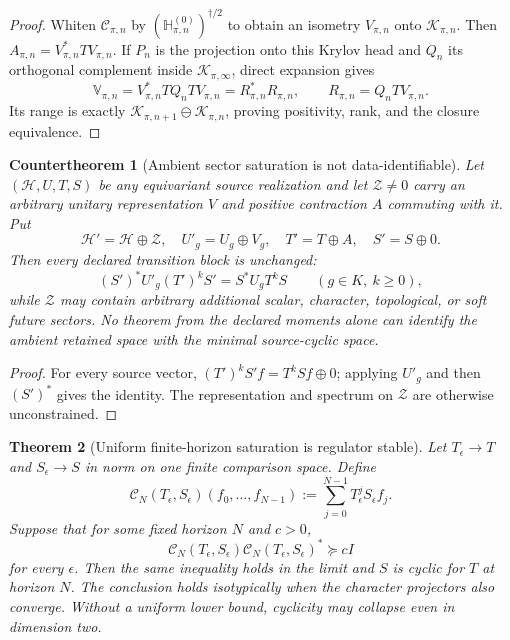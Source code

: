 \documentclass[11pt]{article}
\newtheorem{theorem}{Theorem}[section]
\newtheorem{countertheorem}[theorem]{Countertheorem}
\theoremstyle{definition}
\theoremstyle{remark}
\newcommand{\Hh}{\mathcal H}
\begin{document}
\begin{proof}
Whiten $\mathcal C_{\pi,n}$ by
$(\mathbb H_{\pi,n}^{(0)})^{\dagger/2}$ to obtain an isometry $V_{\pi,n}$ onto
$\mathcal K_{\pi,n}$.  Then $A_{\pi,n}=V_{\pi,n}^*TV_{\pi,n}$.  If $P_n$ is
the projection onto this Krylov head and $Q_n$ its orthogonal complement inside
$\mathcal K_{\pi,\infty}$, direct expansion gives
\[
 \mathbb V_{\pi,n}
 =V_{\pi,n}^*TQ_nTV_{\pi,n}=R_{\pi,n}^*R_{\pi,n},
 \qquad R_{\pi,n}=Q_nTV_{\pi,n}.
\]
Its range is exactly
$\mathcal K_{\pi,n+1}\ominus\mathcal K_{\pi,n}$, proving positivity, rank, and
the closure equivalence.
\end{proof}

\begin{countertheorem}[Ambient sector saturation is not data-identifiable]
\label{cth:ambient-source-master}
Let $(\Hh,U,T,S)$ be any equivariant source realization and let
$\mathcal Z\ne0$ carry an arbitrary unitary representation $V$ and positive
contraction $A$ commuting with it.  Put
\[
 \Hh'=\Hh\oplus\mathcal Z,
 \quad U'_g=U_g\oplus V_g,
 \quad T'=T\oplus A,
 \quad S'=S\oplus0.
\]
Then every declared transition block is unchanged:
\[
 (S')^*U'_g(T')^kS'=S^*U_gT^kS
 \qquad(g\in K,\ k\ge0),
\]
while $\mathcal Z$ may contain arbitrary additional scalar, character,
topological, or soft future sectors.  No theorem from the declared moments
alone can identify the ambient retained space with the minimal source-cyclic
space.
\end{countertheorem}

\begin{proof}
For every source vector, $(T')^kS'f=T^kSf\oplus0$; applying $U'_g$ and then
$(S')^*$ gives the identity.  The representation and spectrum on
$\mathcal Z$ are otherwise unconstrained.
\end{proof}

\begin{theorem}[Uniform finite-horizon saturation is regulator stable]
\label{thm:source-regulator-master}
Let $T_\epsilon\to T$ and $S_\epsilon\to S$ in norm on one finite comparison
space.  Define
\[
 \mathcal C_N(T_\epsilon,S_\epsilon)(f_0,\ldots,f_{N-1})
 :=\sum_{j=0}^{N-1}T_\epsilon^jS_\epsilon f_j.
\]
Suppose that for some fixed horizon $N$ and $c>0$,
\[
 \mathcal C_N(T_\epsilon,S_\epsilon)
 \mathcal C_N(T_\epsilon,S_\epsilon)^*\succeq cI
\]
for every $\epsilon$.  Then the same inequality holds in the limit and $S$ is
cyclic for $T$ at horizon $N$.  The conclusion holds isotypically when the
character projectors also converge.  Without a uniform lower bound, cyclicity
may collapse even in dimension two.
\end{theorem}
\end{document}
